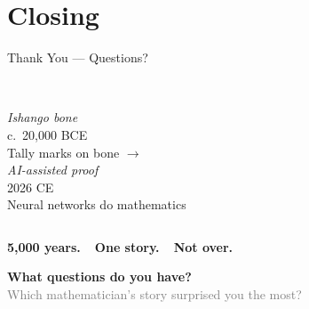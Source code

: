 \section{Closing}

\begin{frame}[shrink=25]{Thank You --- Questions?}

  \begin{center}
  \end{center}

  \vspace{0.5em}

  \begin{center}
    \begin{tcolorbox}[colframe=digitalBlue,colback=white,boxrule=1pt,arc=4pt,width=0.85\textwidth]
      \centering
      \begin{columns}
        \centering
        {\large\faImage}\\[4pt]
        {\footnotesize\textit{Ishango bone}\\c.\ 20,000 BCE\\[2pt]Tally marks on bone}
        \centering
        {\Huge\textcolor{accentOrange}{$\longrightarrow$}}
        \centering
        {\large\faRobot}\\[4pt]
        {\footnotesize\textit{AI-assisted proof}\\2026 CE\\[2pt]Neural networks do mathematics}
      \end{columns}
      \vspace{0.5em}
      {\large\bfseries\textcolor{digitalBlue}{5,000 years.\ \ One story.\ \ Not over.}}
    \end{tcolorbox}
  \end{center}

  \vspace{0.5em}

  \begin{center}
    {\Large\bfseries\textcolor{digitalBlue}{What questions do you have?}}\\[1em]
    {\large\textcolor{gray}{Which mathematician's story surprised you the most?}}
  \end{center}


\end{frame}
